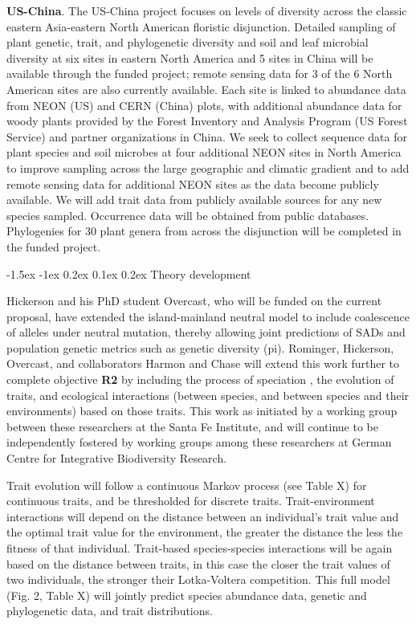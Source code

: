 \documentclass[11pt]{article}
\makeatletter
\renewcommand\subsubsection{\@startsection{subsection}{1}{\z@}%
                                  {-1.5ex \@plus -1ex \@minus 0.2ex}%
                                  {0.1ex \@plus 0.2ex}%
                                  {\normalfont\bfseries}}
\makeatother
\begin{document}
\textbf{US-China}. The US-China project focuses on levels of diversity
across the classic eastern Asia-eastern North American floristic
disjunction. Detailed sampling of plant genetic, trait, and
phylogenetic diversity and soil and leaf microbial diversity at six
sites in eastern North America and 5 sites in China will be available
through the funded project; remote sensing data for 3 of the 6 North
American sites are also currently available. Each site is linked to
abundance data from NEON (US) and CERN (China) plots, with additional
abundance data for woody plants provided by the Forest Inventory and
Analysis Program (US Forest Service) and partner organizations in
China. We seek to collect sequence data for plant species and soil
microbes at four additional NEON sites in North America to improve
sampling across the large geographic and climatic gradient and to add
remote sensing data for additional NEON sites as the data become
publicly available. We will add trait data from publicly available
sources for any new species sampled. Occurrence data will be obtained
from public databases. Phylogenies for 30 plant genera from across the
disjunction will be completed in the funded project.


\subsubsection{Theory development}\label{theory-development}

Hickerson and his PhD student Overcast, who will be funded on the
current proposal, have extended the island-mainland neutral model
\cite{Rosindell2013-di} to include coalescence of alleles under neutral
mutation, thereby allowing joint predictions of SADs and population
genetic metrics such as genetic diversity (pi). Rominger, Hickerson,
Overcast, and collaborators Harmon and Chase will extend this work
further to complete objective \textbf{R2} by including the process of
speciation \cite{Rosindell2010-gq}, the evolution of traits, and
ecological interactions (between species, and between species and their
environments) based on those traits. This work as initiated by a working
group between these researchers at the Santa Fe Institute, and will
continue to be independently fostered by working groups among these
researchers at German Centre for Integrative Biodiversity Research.

Trait evolution will follow a continuous Markov process (see Table X)
for continuous traits, and be thresholded \cite{Felsenstein2012-aj} for
discrete traits. Trait-environment interactions will depend on the
distance between an individual's trait value and the optimal trait value
for the environment, the greater the distance the less the fitness of
that individual. Trait-based species-species interactions will be again
based on the distance between traits, in this case the closer the trait
values of two individuals, the stronger their Lotka-Voltera
\cite{Wilson2003-kp} competition. This full model (Fig. 2, Table X) will
jointly predict species abundance data, genetic and phylogenetic data,
and trait distributions.
\end{document}
